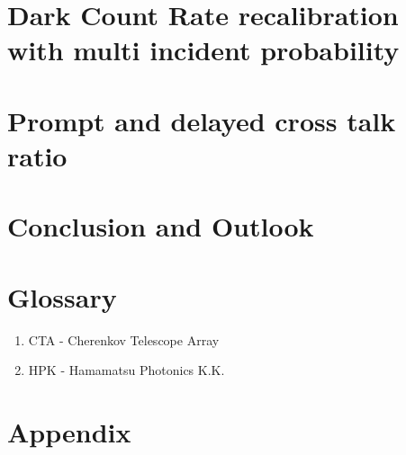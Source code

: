 \documentclass[12pt,article,type=msc,colorback,accentcolor=tud9c]{tudthesis}
\begin{document}


\section{\Large Dark Count Rate recalibration with multi incident probability}

\section{\Large Prompt and delayed cross talk ratio}




\section{\Large Conclusion and Outlook}





\newpage
\section{\Large Glossary}
\begin{enumerate}
\item CTA - Cherenkov Telescope Array
\item HPK - Hamamatsu Photonics K.K.
\end{enumerate}





\clearpage
\section{\Large Appendix}
\end{document}
